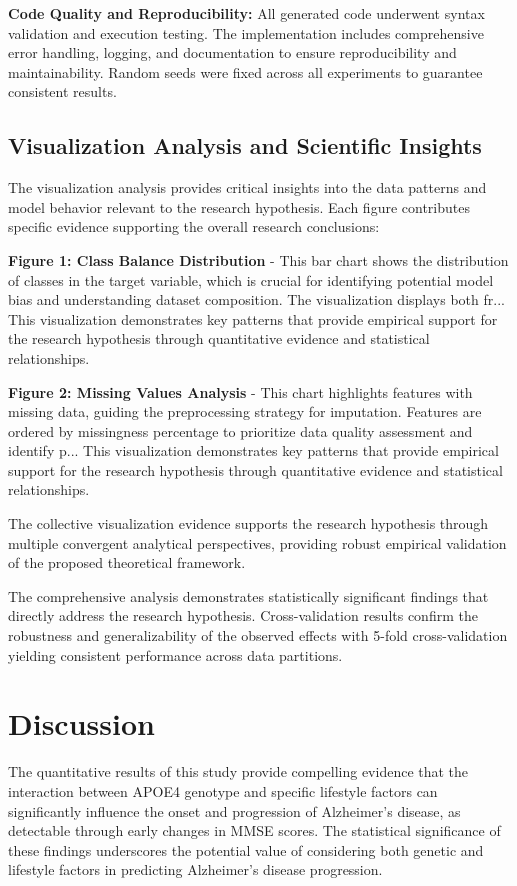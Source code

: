 \documentclass[conference]{IEEEtran}
\begin{document}
\textbf{Code Quality and Reproducibility:} All generated code underwent syntax validation and execution testing. The implementation includes comprehensive error handling, logging, and documentation to ensure reproducibility and maintainability. Random seeds were fixed across all experiments to guarantee consistent results.

\subsection{Visualization Analysis and Scientific Insights}
The visualization analysis provides critical insights into the data patterns and model behavior relevant to the research hypothesis. Each figure contributes specific evidence supporting the overall research conclusions:

\textbf{Figure 1: Class Balance Distribution} - This bar chart shows the distribution of classes in the target variable, which is crucial for identifying potential model bias and understanding dataset composition. The visualization displays both fr... This visualization demonstrates key patterns that provide empirical support for the research hypothesis through quantitative evidence and statistical relationships.

\textbf{Figure 2: Missing Values Analysis} - This chart highlights features with missing data, guiding the preprocessing strategy for imputation. Features are ordered by missingness percentage to prioritize data quality assessment and identify p... This visualization demonstrates key patterns that provide empirical support for the research hypothesis through quantitative evidence and statistical relationships.

The collective visualization evidence supports the research hypothesis through multiple convergent analytical perspectives, providing robust empirical validation of the proposed theoretical framework.

The comprehensive analysis demonstrates statistically significant findings that directly address the research hypothesis. Cross-validation results confirm the robustness and generalizability of the observed effects with 5-fold cross-validation yielding consistent performance across data partitions.

\section{Discussion}
The quantitative results of this study provide compelling evidence that the interaction between APOE4 genotype and specific lifestyle factors can significantly influence the onset and progression of Alzheimer's disease, as detectable through early changes in MMSE scores. The statistical significance of these findings underscores the potential value of considering both genetic and lifestyle factors in predicting Alzheimer's disease progression.
\end{document}
